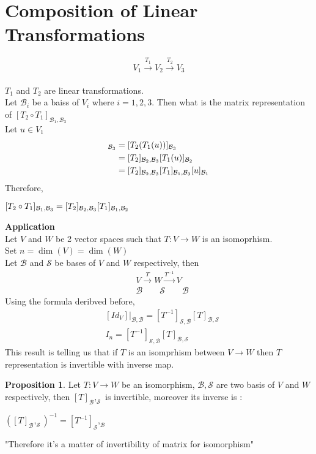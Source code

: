 \documentclass[
12pt,
]{article}
\newcommand{\tvw}{T : V\xrightarrow{} W }
\theoremstyle{definition}
\theoremstyle{definition}
\theoremstyle{definition}
\theoremstyle{definition}
\newtheorem{Proposition}{Proposition}[section]
\begin{document}
\section{Composition of Linear Transformations}
 \large$$ V_1 \xrightarrow{T_1} V_2 \xrightarrow{T_2} V_3$$\\
\normalsize
$T_1$ and $T_2$ are linear transformations.\\
Let $\mathcal{B}_i$ be a baiss of $V_i$ where $ i = 1,2,3 $. Then what is the matrix representation of $[T_2 \circ T_1]_{\mathcal{B}_1,\mathcal{B}_3}$ \\
Let $ u \in V_1$
\begin{align*}
    [T_2\circ T_1(u)]_{\mathcal{B}_3} &= [T_2(T_1(u))]_{\mathcal{B}_3}\\
     \large &=[T_2]_{\mathcal{B}_2 , \mathcal{B}_3}[T_1(u)]_{\mathcal{B}_2} \\
    &=[T_2]_{\mathcal{B}_2 , \mathcal{B}_3}[T_1]_{\mathcal{B}_1 ,\mathcal{B}_3}[u]_{\mathcal{B}_1}
\end{align*}
\normalsize
Therefore, 
\begin{center}
    $[T_2\circ T_1]_{\mathcal{B}_1,\mathcal{B}_3} =  \large [T_2]_{\mathcal{B}_2,\mathcal{B}_3}[T_1]_{\mathcal{B}_1,\mathcal{B}_2}$
\end{center}
\normalsize
\textbf{Application}\\
Let $V$ and $W$ be 2 vector spaces such that $T : V \xrightarrow{} W$ is an isomoprhism.\\
Set $n = \dim(V) = \dim(W)$ \\
Let $\mathcal{B}$ and $\mathcal{S}$ be bases of $V$ and $W$ respectively, then \\
\begin{align*}
    &V\xrightarrow{T} W \xrightarrow{T^{-1}} V \\
    &\mathcal{B}\qquad \mathcal{S} \qquad \mathcal{B}
\end{align*}
Using the formula deribved before, 
\begin{align*}
&[Id_V]|_{\mathcal{B} , \mathcal{B}} = [T^{-1}]_{\mathcal{S} , \mathcal{B}}[T]_{\mathcal{B} , \mathcal{S}} \\
&I_n = [T^{-1}]_{\mathcal{S} , \mathcal{B}}[T]_{\mathcal{B} , \mathcal{S}}
\end{align*}
This result is telling us that if $T$ is an isomprhism between $V \xrightarrow{} W$ then $T$ representation is invertible with inverse map.
\begin{Proposition}
	Let $\tvw$ be an isomorphism, $\mathcal{B}, \mathcal{S}$ are two basis of $V$ and $W$ respectively, \newline
	then $[T]_\mathcal{B}{},_\mathcal{S}$ is invertible, moreover its inverse  is :
	\begin{center}
		$([T]_\mathcal{B}{},_\mathcal{S})^{-1} = [T^{-1}]_\mathcal{S}{},_\mathcal{B}$
	\end{center}
	"Therefore it's a matter of invertibility of matrix for isomorphism"
\end{Proposition}
\end{document}
